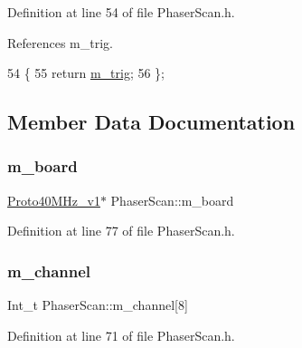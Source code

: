 Definition at line 54 of file Phaser\+Scan.\+h.



References m\+\_\+trig.


\begin{DoxyCode}
54                  \{
55     \textcolor{keywordflow}{return} \hyperlink{classPhaserScan_ab3fd16cfcce13a09f5c1e91d96de60e6}{m\_trig};
56   \};
\end{DoxyCode}


\subsection{Member Data Documentation}
\mbox{\label{classPhaserScan_aec1f340810d0cf1f98155673385ffff5}} 
\subsubsection{\texorpdfstring{m\+\_\+board}{m\_board}}
{\footnotesize\ttfamily \hyperlink{classProto40MHz__v1}{Proto40\+M\+Hz\+\_\+v1}$\ast$ Phaser\+Scan\+::m\+\_\+board\hspace{0.3cm}{\ttfamily [private]}}



Definition at line 77 of file Phaser\+Scan.\+h.

\mbox{\label{classPhaserScan_a983fb003ef3c41d1dcf1078247548d82}} 
\subsubsection{\texorpdfstring{m\+\_\+channel}{m\_channel}}
{\footnotesize\ttfamily Int\+\_\+t Phaser\+Scan\+::m\+\_\+channel\mbox{[}8\mbox{]}\hspace{0.3cm}{\ttfamily [private]}}



Definition at line 71 of file Phaser\+Scan.\+h.

\mbox{\label{classPhaserScan_a3e9894ae646ed25d26a07532c1a2b8b7}} 
